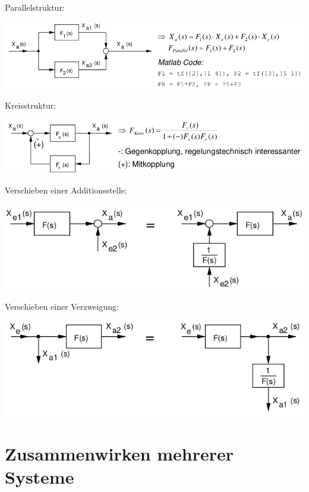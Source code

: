\documentclass[10pt,a4paper]{article}
\begin{document}
Parallelstruktur:
\begin{center}
	\includegraphics[width=0.96\columnwidth]{Figures/Parallelstruktur.png}
\end{center}

Kreisstruktur:
\begin{center}
	\includegraphics[width=0.96\columnwidth]{Figures/Kreisstruktur.png}
\end{center}

Verschieben einer Additionsstelle:
\begin{center}
	\includegraphics[width=0.96\columnwidth]{Figures/Verschiebung einer Additionsstelel.png}
\end{center}

Verschieben einer Verzweigung:
\begin{center}
	\includegraphics[width=0.96\columnwidth]{Figures/Verschiebung einer Verzweigung.png}
\end{center}

\section{Zusammenwirken mehrerer Systeme}
\end{document}

